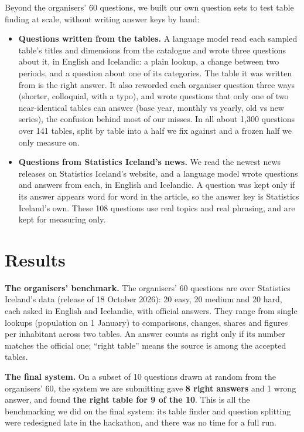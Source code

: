 \documentclass[10pt,a4paper]{article}
\begin{document}
Beyond the organisers' 60 questions, we built our own question sets to test table finding at scale, without writing
answer keys by hand:
\begin{itemize}
  \item \textbf{Questions written from the tables.} A language model read each sampled table's titles and dimensions
        from the catalogue and wrote three questions about it, in English and Icelandic: a plain lookup, a change
        between two periods, and a question about one of its categories. The table it was written from is the right
        answer. It also reworded each organiser question three ways (shorter, colloquial, with a typo), and wrote
        questions that only one of two near-identical tables can answer (base year, monthly vs yearly, old vs new
        series), the confusion behind most of our misses. In all about 1,300 questions over 141 tables, split by table
        into a half we fix against and a frozen half we only measure on.
  \item \textbf{Questions from Statistics Iceland's news.} We read the newest news releases on Statistics Iceland's
        website, and a language model wrote questions and answers from each, in English and Icelandic. A question was
        kept only if its answer appears word for word in the article, so the answer key is Statistics Iceland's own.
        These 108 questions use real topics and real phrasing, and are kept for measuring only.
\end{itemize}

\section*{Results}

\textbf{The organisers' benchmark.} The organisers' 60 questions are over Statistics Iceland's data (release of
18 October 2026): 20 easy, 20 medium and 20 hard, each asked in English and Icelandic, with official answers. They
range from single lookups (population on 1 January) to comparisons, changes, shares and figures per inhabitant
across two tables. An answer counts as right only if its number matches the official one; ``right table'' means the
source is among the accepted tables.

\textbf{The final system.} On a subset of 10 questions drawn at random from the organisers' 60, the system we are
submitting gave \textbf{8 right answers} and 1 wrong answer, and found \textbf{the right table for 9 of the 10}. This
is all the benchmarking we did on the final system: its table finder and question splitting were redesigned late in
the hackathon, and there was no time for a full run.
\end{document}
